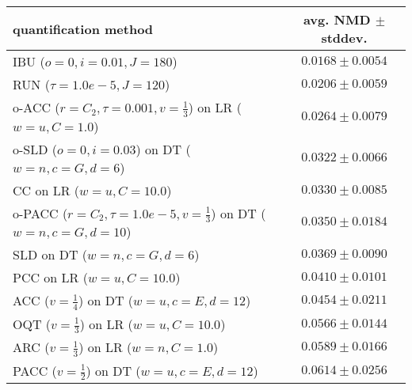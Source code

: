 \begin{tabular}{lc}
  \toprule
  quantification method & avg. NMD $\pm$ stddev. \\
  \midrule
  IBU ($o=0, i=0.01, J=180$) & $\mathbf{0.0168 \pm 0.0054}$ \\
  RUN ($\tau=1.0e-5, J=120$) & $0.0206 \pm 0.0059$ \\
  o-ACC ($r=C_2, \tau=0.001, v=\frac{1}{3}$) on LR ($w=u, C=1.0$) & $0.0264 \pm 0.0079$ \\
  o-SLD ($o=0, i=0.03$) on DT ($w=n, c=G, d=6$) & $0.0322 \pm 0.0066$ \\
  CC on LR ($w=u, C=10.0$) & $0.0330 \pm 0.0085$ \\
  o-PACC ($r=C_2, \tau=1.0e-5, v=\frac{1}{3}$) on DT ($w=n, c=G, d=10$) & $0.0350 \pm 0.0184$ \\
  SLD on DT ($w=n, c=G, d=6$) & $0.0369 \pm 0.0090$ \\
  PCC on LR ($w=u, C=10.0$) & $0.0410 \pm 0.0101$ \\
  ACC ($v=\frac{1}{4}$) on DT ($w=u, c=E, d=12$) & $0.0454 \pm 0.0211$ \\
  OQT ($v=\frac{1}{3}$) on LR ($w=u, C=10.0$) & $0.0566 \pm 0.0144$ \\
  ARC ($v=\frac{1}{3}$) on LR ($w=n, C=1.0$) & $0.0589 \pm 0.0166$ \\
  PACC ($v=\frac{1}{2}$) on DT ($w=u, c=E, d=12$) & $0.0614 \pm 0.0256$ \\
  \bottomrule
\end{tabular}

